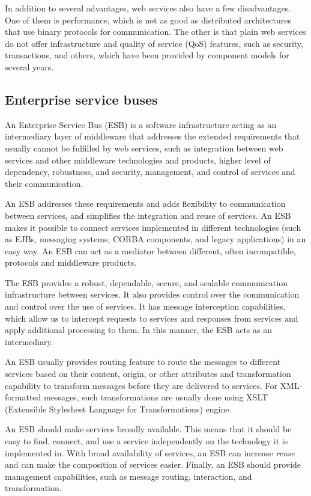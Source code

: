 In addition to several advantages, web services also have a few disadvantages. One of them is performance, which is not as good as distributed architectures that use binary protocols for communication. The other is that plain web services do not offer infrastructure and quality of service (QoS) features, such as security, transactions, and others, which have been provided by component models for several years.

\subsection{Enterprise service buses}
An Enterprise Service Bus (ESB) is a software infrastructure acting as an intermediary layer of middleware that addresses the extended requirements that usually cannot be fulfilled by web services, such as integration between web services and other middleware technologies and products, higher level of dependency, robustness, and security, management, and control of services and their communication.

An ESB addresses these requirements and adds flexibility to communication between services, and simplifies the integration and reuse of services. An ESB makes it possible to connect services implemented in different technologies (such as EJBs, messaging systems, CORBA components, and legacy applications) in an easy way. An ESB can act as a mediator between different, often incompatible, protocols and middleware products.

The ESB provides a robust, dependable, secure, and scalable communication infrastructure between services. It also provides control over the communication and control over the use of services. It has message interception capabilities, which allow us to intercept requests to services and responses from services and apply additional processing to them. In this manner, the ESB acts as an intermediary.

An ESB usually provides routing feature to route the messages to different services based on their content, origin, or other attributes and transformation capability to transform messages before they are delivered to services. For XML-formatted messages, such transformations are usually done using XSLT (Extensible Stylesheet Language for Transformations) engine.

An ESB should make services broadly available. This means that it should be easy to find, connect, and use a service independently on the technology it is implemented in. With broad availability of services, an ESB can increase \textit{reuse} and can make the composition of services easier. Finally, an ESB should provide management capabilities, such as message routing, interaction, and transformation.

